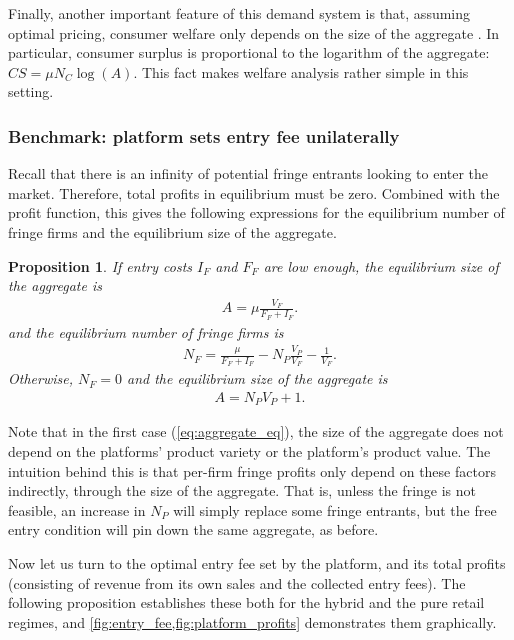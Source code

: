 \documentclass[a4paper]{article}
\newtheorem{proposition}{Proposition}
\begin{document}
Finally, another important feature of this demand system is that, assuming optimal pricing, consumer welfare only depends on the size of the aggregate \parencite{anderson2020aggregative}.
In particular, consumer surplus is proportional to the logarithm of the aggregate: $CS = \mu N_C \log(A)$. This fact makes welfare analysis rather simple in this setting.

\subsubsection{Benchmark: platform sets entry fee unilaterally}

Recall that there is an infinity of potential fringe entrants looking to enter the market.
Therefore, total profits in equilibrium must be zero.
Combined with the  profit function, this gives the following expressions for the equilibrium number of fringe firms and the equilibrium size of the aggregate.
\begin{proposition}
    \label{prop:equilibrium_aggregate}
    If entry costs $I_F$ and $F_F$ are low enough, the equilibrium size of the aggregate is
    \begin{align}
        A = \mu \frac{V_F}{F_F + I_F}.
        \label{eq:aggregate_eq}
    \end{align}
    and the equilibrium number of fringe firms is
    \begin{align*}
        N_F = \frac{\mu}{F_F + I_F} - N_P \frac{V_P}{V_F} - \frac{1}{V_F}.
    \end{align*}
    Otherwise,  $N_F = 0$ and the equilibrium size of the aggregate is
    \begin{align*}
        A = N_P V_P + 1.
    \end{align*}
\end{proposition}
Note that in the first case (\cref{eq:aggregate_eq}), the size of the aggregate does not depend on the platforms' product variety or the platform's product value.
The intuition behind this is that per-firm fringe profits only depend on these factors indirectly, through the size of the aggregate.
That is, unless the fringe is not feasible, an increase in $N_P$ will simply replace some fringe entrants, but the free entry condition will pin down the same aggregate, as before.

Now let us turn to the optimal entry fee set by the platform, and its total profits (consisting of revenue from its own sales and the collected entry fees).
The following proposition establishes these both for the hybrid and the pure retail regimes, and \cref{fig:entry_fee,fig:platform_profits} demonstrates them graphically.
\end{document}
